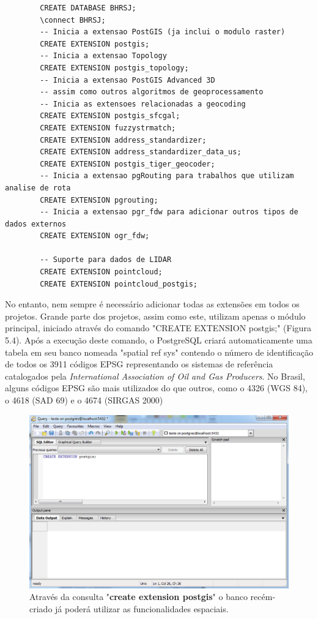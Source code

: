 	\begin{minipage}{\linewidth}
	\begin{lstlisting}
		CREATE DATABASE BHRSJ;
		\connect BHRSJ;
		-- Inicia a extensao PostGIS (ja inclui o modulo raster)
		CREATE EXTENSION postgis;
		-- Inicia a extensao Topology
		CREATE EXTENSION postgis_topology;
		-- Inicia a extensao PostGIS Advanced 3D 
		-- assim como outros algoritmos de geoprocessamento
		-- Inicia as extensoes relacionadas a geocoding
		CREATE EXTENSION postgis_sfcgal;
		CREATE EXTENSION fuzzystrmatch;
		CREATE EXTENSION address_standardizer;
		CREATE EXTENSION address_standardizer_data_us;
		CREATE EXTENSION postgis_tiger_geocoder;
		-- Inicia a extensao pgRouting para trabalhos que utilizam analise de rota
		CREATE EXTENSION pgrouting;
		-- Inicia a extensao pgr_fdw para adicionar outros tipos de dados externos
		CREATE EXTENSION ogr_fdw;
		
		-- Suporte para dados de LIDAR
		CREATE EXTENSION pointcloud;
		CREATE EXTENSION pointcloud_postgis;
	\end{lstlisting}
	\end{minipage}

No entanto, nem sempre é necessário adicionar todas as extensões em todos os projetos. Grande parte dos projetos, assim como este, utilizam apenas o módulo principal, iniciado através do comando "CREATE EXTENSION postgis;" (Figura 5.4). Após a execução deste comando, o PostgreSQL criará automaticamente uma tabela em seu banco nomeada "spatial ref sys" contendo o número de identificação de todos os 3911 códigos EPSG representando os sistemas de referência catalogados pela \textit{International Association of Oil and Gas Producers}. No Brasil, alguns códigos EPSG são mais utilizados do que outros, como o 4326 (WGS 84), o 4618 (SAD 69) e o 4674 (SIRGAS 2000)

	\begin{figure}
		\centering
		\includegraphics[width=1\linewidth]{data/create_extension_postgis}
		\caption{Através da consulta "\textbf{create extension postgis}" o banco recém-criado já poderá utilizar as funcionalidades espaciais.}
		\label{fig:createextensionpostgis}
	\end{figure}


